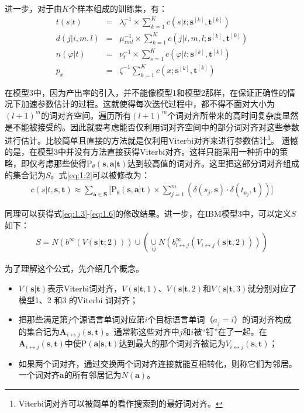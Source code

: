 \begin{appendices}
\parinterval 进一步，对于由$K$个样本组成的训练集，有：
\begin{eqnarray}
t(s|t) & = & \lambda_{t}^{-1} \times \sum_{k=1}^{K}c(s|t;\mathbf{s}^{[k]},\mathbf{t}^{[k]}) \label{eq:1.7} \\
d(j|i,m,l) & = & \mu_{iml}^{-1} \times \sum_{k=1}^{K}c(j|i,m,l;\mathbf{s}^{[k]},\mathbf{t}^{[k]}) \label{eq:1.8} \\
n(\varphi|t) & = & \nu_{t}^{-1} \times \sum_{s=1}^{K}c(\varphi |t;\mathbf{s}^{[k]},\mathbf{t}^{[k]}) \label{eq:1.9} \\
p_x & = & \zeta^{-1} \sum_{k=1}^{K}c(x;\mathbf{s}^{[k]},\mathbf{t}^{[k]}) \label{eq:1.10}
\end{eqnarray}

\parinterval 在模型3中，因为产出率的引入，并不能像模型1和模型2那样，在保证正确性的情况下加速参数估计的过程。这就使得每次迭代过程中，都不得不面对大小为$(l+1)^m$的词对齐空间。遍历所有$(l+1)^m$个词对齐所带来的高时间复杂度显然是不能被接受的。因此就要考虑能否仅利用词对齐空间中的部分词对齐对这些参数进行估计。比较简单且直接的方法就是仅利用Viterbi对齐来进行参数估计\footnote{Viterbi词对齐可以被简单的看作搜索到的最好词对齐。}。 遗憾的是，在模型3中并没有方法直接获得Viterbi对齐。这样只能采用一种折中的策略，即仅考虑那些使得$\textrm{P}_{\theta}(\mathbf{s},\mathbf{a}|\mathbf{t})$达到较高值的词对齐。这里把这部分词对齐组成的集合记为$S$。式\ref{eq:1.2}可以被修改为：
\begin{eqnarray}
c(s|t,\mathbf{s},\mathbf{t}) \approx \sum_{\mathbf{a} \in \mathbf{S}}\big[\textrm{P}_{\theta}(\mathbf{s},\mathbf{a}|\mathbf{t}) \times \sum_{j=1}^{m}(\delta(s_j,\mathbf{s}) \cdot \delta(t_{a_{j}},\mathbf{t})) \big]
\label{eq:1.11}
\end{eqnarray}

\parinterval 同理可以获得式\ref{eq:1.3}-\ref{eq:1.6}的修改结果。进一步，在IBM模型3中，可以定义$S$如下：
\begin{eqnarray}
S = N(b^{\infty}(V(\mathbf{s}|\mathbf{t};2))) \cup (\mathop{\cup}\limits_{ij} N(b_{i \leftrightarrow j}^{\infty}(V_{i \leftrightarrow j}(\mathbf{s}|\mathbf{t},2))))
\label{eq:1.12}
\end{eqnarray}

\parinterval 为了理解这个公式，先介绍几个概念。
\begin{itemize}
\item $V(\mathbf{s}|\mathbf{t})$表示Viterbi词对齐，$V(\mathbf{s}|\mathbf{t},1)$、$V(\mathbf{s}|\mathbf{t},2)$和$V(\mathbf{s}|\mathbf{t},3)$就分别对应了模型1、2 和3 的Viterbi 词对齐；
\item 把那些满足第$j$个源语言单词对应第$i$个目标语言单词（$a_j=i$）的词对齐构成的集合记为$\mathbf{A}_{i \leftrightarrow j}(\mathbf{s},\mathbf{t})$。通常称这些对齐中$j$和$i$被``钉''在了一起。在$\mathbf{A}_{i \leftrightarrow j}(\mathbf{s},\mathbf{t})$中使$\textrm{P}(\mathbf{a}|\mathbf{s},\mathbf{t})$达到最大的那个词对齐被记为$V_{i \leftrightarrow j}(\mathbf{s},\mathbf{t})$；
\item 如果两个词对齐，通过交换两个词对齐连接就能互相转化，则称它们为邻居。一个词对齐$\mathbf{a}$的所有邻居记为$N(\mathbf{a})$。
\end{itemize}


\end{appendices}
